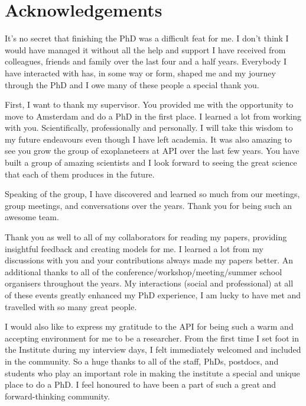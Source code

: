 
\setcounter{footnote}{0}


\chapter{Acknowledgements}


\vspace{10mm}

It's no secret that finishing the PhD was a difficult feat for me. I don't think I would have managed it without all the help and support I have received from colleagues, friends and family over the last four and a half years. Everybody I have interacted with has, in some way or form, shaped me and my journey through the PhD and I owe many of these people a special thank you.

First, I want to thank my supervisor. You provided me with the opportunity to move to Amsterdam and do a PhD in the first place. I learned a lot from working with you. Scientifically, professionally and personally. I will take this wisdom to my future endeavours even though I have left academia. It was also amazing to see you grow the group of exoplaneteers at API over the last few years. You have built a group of amazing scientists and I look forward to seeing the great science that each of them produces in the future.

Speaking of the group, I have discovered and learned so much from our meetings, group meetings, and conversations over the years. Thank you for being such an awesome team.

Thank you as well to all of my collaborators for reading my papers, providing insightful feedback and creating models for me. I learned a lot from my discussions with you and your contributions always made my papers better. An additional thanks to all of the conference/workshop/meeting/summer school organisers throughout the years. My interactions (social and professional) at all of these events greatly enhanced my PhD experience, I am lucky to have met and travelled with so many great people.

I would also like to express my gratitude to the API for being such a warm and accepting environment for me to be a researcher. From the first time I set foot in the Institute during my interview days, I felt immediately welcomed and included in the community. So a huge thanks to all of the staff, PhDs, postdocs, and students who play an important role in making the institute a special and unique place to do a PhD. I feel honoured to have been a part of such a great and forward-thinking community.

